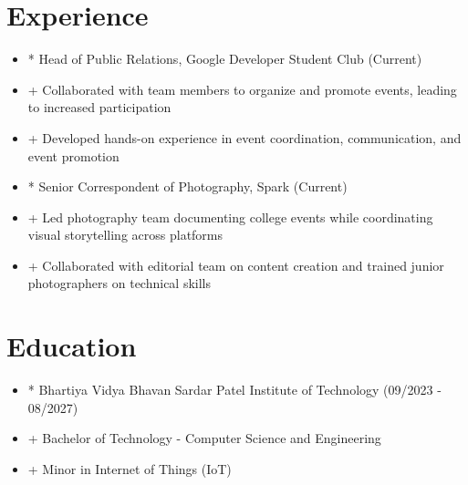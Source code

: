 \documentclass[10pt]{article}
\begin{document}
\section*{Experience}
\begin{itemize}[leftmargin=*]

  \item * Head of Public Relations, Google Developer Student Club (Current)

  \item + Collaborated with team members to organize and promote events, leading to increased participation

  \item + Developed hands-on experience in event coordination, communication, and event promotion

  \item * Senior Correspondent of Photography, Spark (Current)

  \item + Led photography team documenting college events while coordinating visual storytelling across platforms

  \item + Collaborated with editorial team on content creation and trained junior photographers on technical skills

\end{itemize}



\section*{Education}
\begin{itemize}[leftmargin=*]

  \item * Bhartiya Vidya Bhavan Sardar Patel Institute of Technology (09/2023 - 08/2027)

  \item + Bachelor of Technology - Computer Science and Engineering

  \item + Minor in Internet of Things (IoT)

\end{itemize}
\end{document}

